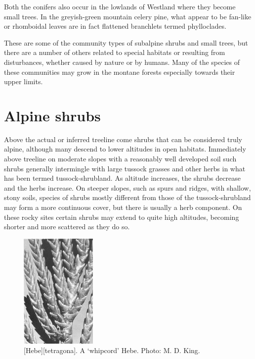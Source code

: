 Both the conifers also occur in the lowlands of Westland where they become small trees.
In the greyish-green mountain celery pine, what appear to be fan-like or rhomboidal leaves are in fact flattened branchlets termed phylloclades.

These are some of the community types of subalpine shrubs and small trees, but there are a number of others related to special habitats or resulting from disturbances, whether caused by nature or by humans.
Many of the species of these communities may grow in the montane forests especially towards their upper limits.

\section{Alpine shrubs}

Above the actual or inferred treeline come shrubs that can be considered truly alpine, although many descend to lower altitudes in open habitats.
Immediately above treeline on moderate slopes with a reasonably well developed soil such shrubs generally intermingle with large tussock grasses and other herbs in what has been termed tussock-shrubland.
As altitude increases, the shrubs decrease and the herbs increase.
On steeper slopes, such as spurs and ridges, with shallow, stony soils, species of shrubs mostly different from those of the tussock-shrubland may form a more continuous cover, but there is usually a herb component.
On these rocky sites certain shrubs may extend to quite high altitudes, becoming shorter and more scattered as they do so.

\begin{figure}
	\includegraphics[width=0.33\textwidth]{graphics/figure93hebe.jpg}
	\centering
	\caption[\emph{Hebe tetragon}]{[Hebe][tetragona].
	A `whipcord' Hebe.
	Photo: M. D. King.}%
	\label{fig:93hebe}
\end{figure}

